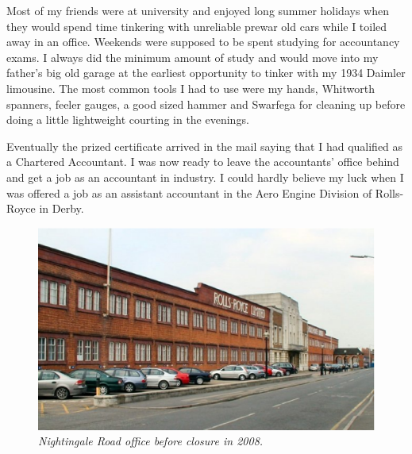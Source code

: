 \begin{multicols}{2}

Most of my friends were at university and enjoyed long summer holidays
when they would spend time tinkering with unreliable prewar old cars
while I toiled away in an office. Weekends were supposed to be spent
studying for accountancy exams. I always did the minimum amount of
study and would move into my father's big old garage at the earliest
opportunity to tinker with my 1934 Daimler limousine. The most common
tools I had to use were my hands, Whitworth spanners, feeler gauges, a
good sized hammer and Swarfega for cleaning up before doing a little
lightweight courting in the evenings.

Eventually the prized certificate arrived in the mail saying that I
had qualified as a Chartered Accountant. I was now ready to leave the
accountants' office behind and get a job as an accountant in
industry. I could hardly believe my luck when I was offered a job as
an assistant accountant in the Aero Engine Division of Rolls-Royce in
Derby.

\end{multicols}

\begin{figure}[ht!]
   \vspace{2em}
   \centering
   \includegraphics[scale=0.75]{rolls_royce.eps}
   \caption*{\small \em Nightingale Road office before closure in 2008.}
   \label{fig:rollsroyce}
\end{figure}

